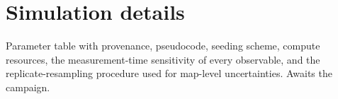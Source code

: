 \section{Simulation details}
\label{app:simulation}

\num{Parameter table with provenance, pseudocode, seeding scheme, compute
resources, the measurement-time sensitivity of every observable, and the
replicate-resampling procedure used for map-level uncertainties. Awaits the
campaign.}
